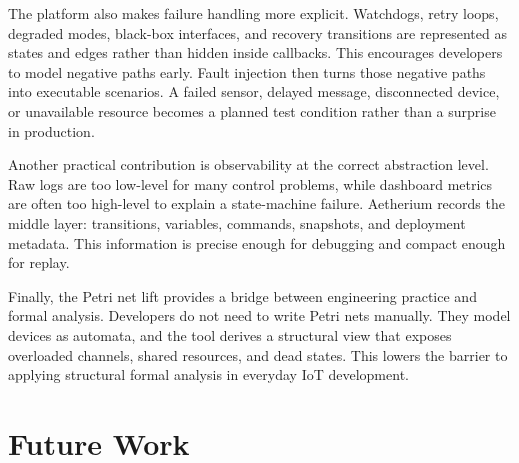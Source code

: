 The platform also makes failure handling more explicit. Watchdogs, retry loops, degraded modes, black-box interfaces, and recovery transitions are represented as states and edges rather than hidden inside callbacks. This encourages developers to model negative paths early. Fault injection then turns those negative paths into executable scenarios. A failed sensor, delayed message, disconnected device, or unavailable resource becomes a planned test condition rather than a surprise in production.

Another practical contribution is observability at the correct abstraction level. Raw logs are too low-level for many control problems, while dashboard metrics are often too high-level to explain a state-machine failure. Aetherium records the middle layer: transitions, variables, commands, snapshots, and deployment metadata. This information is precise enough for debugging and compact enough for replay.

Finally, the Petri net lift provides a bridge between engineering practice and formal analysis. Developers do not need to write Petri nets manually. They model devices as automata, and the tool derives a structural view that exposes overloaded channels, shared resources, and dead states. This lowers the barrier to applying structural formal analysis in everyday IoT development.

\section{Future Work}


